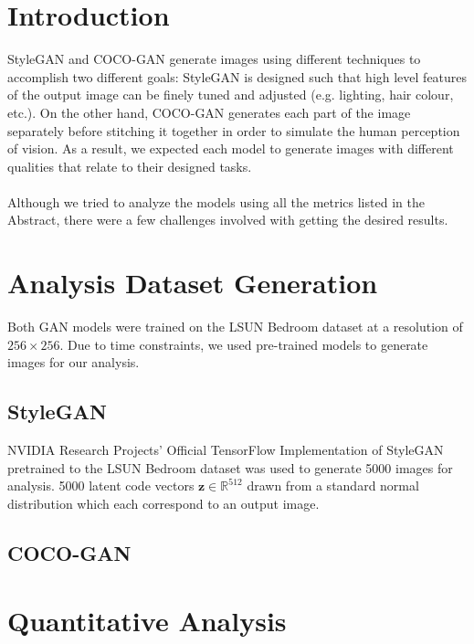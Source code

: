 \documentclass[12pt]{article}
\begin{document}
\begin{multicols*}{2}
        \section{Introduction}
        \label{sec:introduction}
        StyleGAN and COCO-GAN generate images using different techniques to accomplish two different goals: StyleGAN is designed such that high level features of the output image can be finely tuned and adjusted (e.g. lighting, hair colour, etc.)\cite{stylegan}.
        On the other hand, COCO-GAN generates each part of the image separately before stitching it together in order to simulate the human perception of vision\cite{cocogan}.
        As a result, we expected each model to generate images with different qualities that relate to their designed tasks.\\\\
        Although we tried to analyze the models using all the metrics listed in the Abstract, there were a few challenges involved with getting the desired results.

        \section{Analysis Dataset Generation}
        \label{sec:dataset}
        Both GAN models were trained on the LSUN Bedroom dataset\cite{lsunBedroom} at a resolution of $256 \times 256$.
        Due to time constraints, we used pre-trained models to generate images for our analysis.

        \label{sec:datasetGeneration}
        \subsection{StyleGAN}
        \label{subsec:styleganGeneration}
        NVIDIA Research Projects' Official TensorFlow Implementation of StyleGAN pretrained to the LSUN Bedroom dataset\cite{styleGANCode} was used to generate 5000 images for analysis.
        5000 latent code vectors $\mathbf{z} \in \mathbb{R}^{512}$ drawn from a standard normal distribution which each correspond to an output image.


        \subsection{COCO-GAN}
        \label{subsec:cocoganGeneration}

        \section{Quantitative Analysis}
        \label{sec:quantitative}

\end{multicols*}
\end{document}
